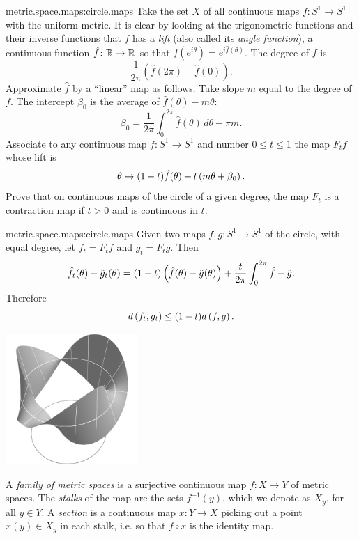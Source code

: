 \begin{problem}{metric.space.maps:circle.maps}
Take the set \(X\) of all continuous maps \(f \colon S^1 \to S^1\) with the uniform metric.
It is clear by looking at the trigonometric functions and their inverse functions that \(f\) has a \emph{lift} (also called its \emph{angle function}),  a continuous function \(\hat{f} \colon \mathbb{R}^{} \to \mathbb{R}^{}\) so that \(f(e^{i\theta})=e^{i\hat{f}(\theta)}\).
The degree of \(f\) is 
\[
\frac{1}{2\pi}(\hat{f}(2\pi)-\hat{f}(0)).
\]
Approximate \(\hat{f}\) by a ``linear'' map as follows.
Take slope \(m\) equal to the degree of \(f\).
The intercept \(\beta_0\) is the average of \(\hat{f}(\theta)-m\theta\):
\[
\beta_0 = \frac{1}{2\pi} \int_0^{2\pi} \hat{f}(\theta) \, d\theta
-
\pi m.
\]
Associate to any continuous map \(f \colon S^1 \to S^1\) and number \(0 \le t \le 1\) the map \(F_t f\) whose lift is
\[
\theta \mapsto (1-t)\hat{f}(\theta)+t\left(m\theta+\beta_0\right).
\]
Prove that on continuous maps of the circle of a given degree, the map \(F_t\) is a contraction map if \(t>0\) and is continuous in \(t\).
\end{problem}
\begin{answer}{metric.space.maps:circle.maps}
Given two maps \(f, g \colon S^1 \to S^1\) of the circle, with equal degree, let \(f_t=F_t f\) and \(g_t=F_t g\). 
Then
\[
\hat{f}_t(\theta)-\hat{g}_t(\theta) = (1-t)\left(\hat{f}(\theta)-\hat{g}(\theta)\right)
+\frac{t}{2\pi} \int_0^{2\pi} \hat{f}-\hat{g}.
\]
Therefore
\[
d\left(f_t,g_t\right)
\le
(1-t)d\left(f,g\right).
\]
\end{answer}
\begin{center}
\includegraphics[width=5cm]{moebius-strip-as-bundle}
\end{center}
A \emph{family of metric spaces} is a surjective continuous map \(f \colon X \to Y\) of metric spaces.
The \emph{stalks} of the map are the sets \(f^{-1}(y)\), which we denote as \(X_y\), for all \(y \in Y\).
A \emph{section} is a continuous map \(x \colon Y \to X\) picking out a point \(x(y) \in X_y\) in each stalk, i.e. so that \(f \circ x\) is the identity map.

